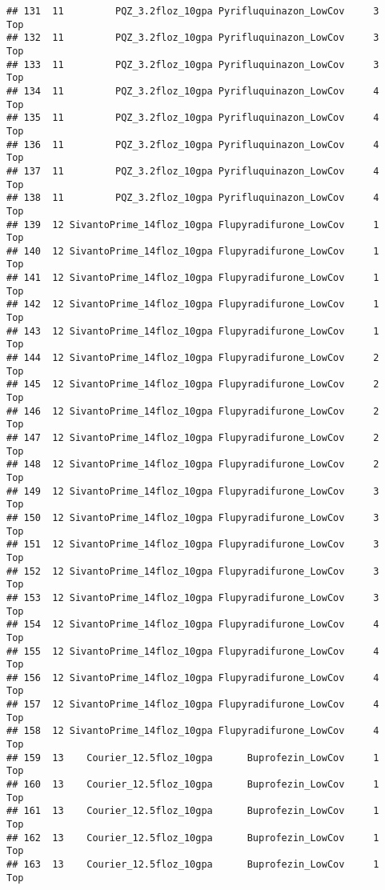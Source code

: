 \documentclass[
]{article}
\begin{document}
\begin{verbatim}
## 131  11         PQZ_3.2floz_10gpa Pyrifluquinazon_LowCov     3           Top
## 132  11         PQZ_3.2floz_10gpa Pyrifluquinazon_LowCov     3           Top
## 133  11         PQZ_3.2floz_10gpa Pyrifluquinazon_LowCov     3           Top
## 134  11         PQZ_3.2floz_10gpa Pyrifluquinazon_LowCov     4           Top
## 135  11         PQZ_3.2floz_10gpa Pyrifluquinazon_LowCov     4           Top
## 136  11         PQZ_3.2floz_10gpa Pyrifluquinazon_LowCov     4           Top
## 137  11         PQZ_3.2floz_10gpa Pyrifluquinazon_LowCov     4           Top
## 138  11         PQZ_3.2floz_10gpa Pyrifluquinazon_LowCov     4           Top
## 139  12 SivantoPrime_14floz_10gpa Flupyradifurone_LowCov     1           Top
## 140  12 SivantoPrime_14floz_10gpa Flupyradifurone_LowCov     1           Top
## 141  12 SivantoPrime_14floz_10gpa Flupyradifurone_LowCov     1           Top
## 142  12 SivantoPrime_14floz_10gpa Flupyradifurone_LowCov     1           Top
## 143  12 SivantoPrime_14floz_10gpa Flupyradifurone_LowCov     1           Top
## 144  12 SivantoPrime_14floz_10gpa Flupyradifurone_LowCov     2           Top
## 145  12 SivantoPrime_14floz_10gpa Flupyradifurone_LowCov     2           Top
## 146  12 SivantoPrime_14floz_10gpa Flupyradifurone_LowCov     2           Top
## 147  12 SivantoPrime_14floz_10gpa Flupyradifurone_LowCov     2           Top
## 148  12 SivantoPrime_14floz_10gpa Flupyradifurone_LowCov     2           Top
## 149  12 SivantoPrime_14floz_10gpa Flupyradifurone_LowCov     3           Top
## 150  12 SivantoPrime_14floz_10gpa Flupyradifurone_LowCov     3           Top
## 151  12 SivantoPrime_14floz_10gpa Flupyradifurone_LowCov     3           Top
## 152  12 SivantoPrime_14floz_10gpa Flupyradifurone_LowCov     3           Top
## 153  12 SivantoPrime_14floz_10gpa Flupyradifurone_LowCov     3           Top
## 154  12 SivantoPrime_14floz_10gpa Flupyradifurone_LowCov     4           Top
## 155  12 SivantoPrime_14floz_10gpa Flupyradifurone_LowCov     4           Top
## 156  12 SivantoPrime_14floz_10gpa Flupyradifurone_LowCov     4           Top
## 157  12 SivantoPrime_14floz_10gpa Flupyradifurone_LowCov     4           Top
## 158  12 SivantoPrime_14floz_10gpa Flupyradifurone_LowCov     4           Top
## 159  13    Courier_12.5floz_10gpa      Buprofezin_LowCov     1           Top
## 160  13    Courier_12.5floz_10gpa      Buprofezin_LowCov     1           Top
## 161  13    Courier_12.5floz_10gpa      Buprofezin_LowCov     1           Top
## 162  13    Courier_12.5floz_10gpa      Buprofezin_LowCov     1           Top
## 163  13    Courier_12.5floz_10gpa      Buprofezin_LowCov     1           Top

\end{verbatim}
\end{document}
